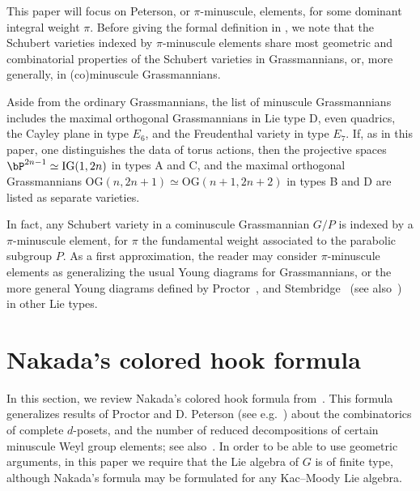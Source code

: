 {This paper will focus on Peterson, or $\pi$-minuscule, elements, for some 
dominant integral weight $\pi$. Before giving the formal definition in 
, we note that the Schubert varieties indexed by $\pi$-minuscule elements
share most geometric and combinatorial properties of the Schubert varieties in Grassmannians, or, 
more generally, in (co)minuscule Grassmannians.\begin{footnote}{Aside from the ordinary Grassmannians, 
the list of minuscule Grassmannians includes the maximal orthogonal 
Grassmannians in Lie type D, even quadrics, the Cayley plane in type $E_6$, 
and the Freudenthal variety in type $E_7$. If, as in this paper, one distinguishes the data of torus actions, 
then the projective spaces $\bP^{2n-1} \simeq \mathrm{IG}(1,2n)$ in types A and C, and the maximal orthogonal 
Grassmannians $\mathrm{OG}(n,2n+1)\simeq \mathrm{OG}(n+1,2n+2)$ in types B and D are listed as 
separate varieties.}\end{footnote} In fact, any Schubert variety in a cominuscule
Grassmannian $G/P$ is indexed by a $\pi$-minuscule element, for $\pi$ the fundamental weight 
associated to the parabolic subgroup $P$. As a first approximation, the reader may 
consider $\pi$-minuscule elements as generalizing the usual Young diagrams for Grassmannians,
or the more general Young diagrams defined by Proctor~\cite{proctor:bruhat,proctor:minuscule}, and Stembridge~\cite{stembridge:fullycomm,stembridge2001minuscule} (see also~\cite{graham.kreiman:cominuscule_pt}) in other Lie types.
}


\section{Nakada's colored hook formula}\label{sec:hook}
In this section, we review Nakada's colored hook formula from~\cite{nakada:colored,nakada:proc}. This formula generalizes results of Proctor 
\cite{proctor:minuscule,proctor:dynkin}
and D. Peterson (see e.g.~\cite{carrell:vector})
about the combinatorics of complete $d$-posets, and the number of reduced 
decompositions of certain minuscule Weyl group elements; see also~\cite{stanley:reduced}. 
In order to be able to use geometric arguments, in this paper we require that the Lie algebra of $G$
is of finite 
type, although Nakada's formula may be formulated for any Kac--Moody Lie algebra.


